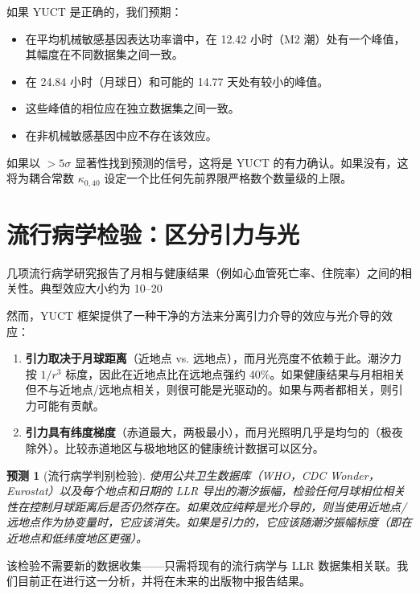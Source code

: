 \documentclass[12pt,a4paper]{article}
\newtheorem{prediction}[theorem]{预测}
\theoremstyle{remark}
\begin{document}
	如果 YUCT 是正确的，我们预期：
	\begin{itemize}
		\item 在平均机械敏感基因表达功率谱中，在 12.42 小时（M2 潮）处有一个峰值，其幅度在不同数据集之间一致。
		\item 在 24.84 小时（月球日）和可能的 14.77 天处有较小的峰值。
		\item 这些峰值的相位应在独立数据集之间一致。
		\item 在非机械敏感基因中应不存在该效应。
	\end{itemize}
	
	如果以 \(> 5\sigma\) 显著性找到预测的信号，这将是 YUCT 的有力确认。如果没有，这将为耦合常数 \(\kappa_{0,40}\) 设定一个比任何先前界限严格数个数量级的上限。
	
	\section{流行病学检验：区分引力与光}
	\label{sec:epidemiology}
	
	几项流行病学研究报告了月相与健康结果（例如心血管死亡率、住院率）之间的相关性。典型效应大小约为 10–20%
	
	然而，YUCT 框架提供了一种干净的方法来分离引力介导的效应与光介导的效应：
	
	\begin{enumerate}
		\item \textbf{引力取决于月球距离}（近地点 vs. 远地点），而月光亮度不依赖于此。潮汐力按 \(1/r^3\) 标度，因此在近地点比在远地点强约 40\%。如果健康结果与月相相关但不与近地点/远地点相关，则很可能是光驱动的。如果与两者都相关，则引力可能有贡献。
		\item \textbf{引力具有纬度梯度}（赤道最大，两极最小），而月光照明几乎是均匀的（极夜除外）。比较赤道地区与极地地区的健康统计数据可以区分。
	\end{enumerate}
	
	\begin{prediction}[流行病学判别检验]
		使用公共卫生数据库（WHO，CDC Wonder，Eurostat）以及每个地点和日期的 LLR 导出的潮汐振幅，检验任何月球相位相关性在控制月球距离后是否仍然存在。如果效应纯粹是光介导的，则当使用近地点/远地点作为协变量时，它应该消失。如果是引力的，它应该随潮汐振幅标度（即在近地点和低纬度地区更强）。
	\end{prediction}
	
	该检验不需要新的数据收集——只需将现有的流行病学与 LLR 数据集相关联。我们目前正在进行这一分析，并将在未来的出版物中报告结果。
	
\end{document}
